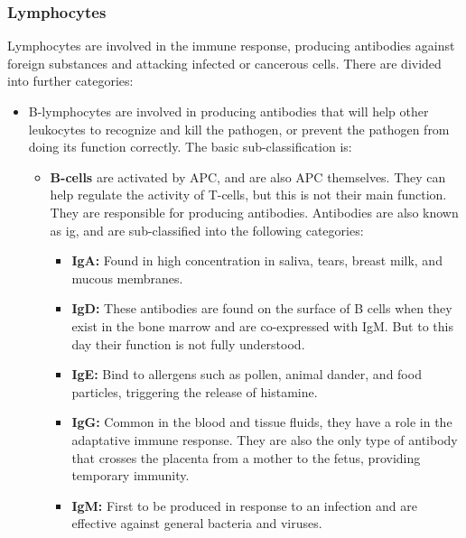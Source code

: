 \subsubsection{Lymphocytes}

Lymphocytes are involved in the immune response, producing antibodies against foreign substances and attacking infected or cancerous cells. There are divided into further categories:

    \begin{itemize}

        \item{B-lymphocytes} are involved in producing antibodies that will help other leukocytes to recognize and kill the pathogen, or prevent the pathogen from doing its function correctly. The basic sub-classification is:

        \begin{itemize}

            \item{\textbf{B-cells}} are activated by APC, and are also APC themselves. They can help regulate the activity of T-cells, but this is not their main function. They are responsible for producing antibodies. Antibodies are also known as \gls{ig}, and are sub-classified into the following categories:
    
                \begin{itemize}
        
                    \item{\textbf{IgA:}} Found in high concentration in saliva, tears, breast milk, and mucous membranes.
            
                    \item{\textbf{IgD:}} These antibodies are found on the surface of B cells when they exist in the bone marrow and are co-expressed with IgM. But to this day their function is not fully understood.
            
                    \item{\textbf{IgE:}} Bind to allergens such as pollen, animal dander, and food particles, triggering the release of histamine.
            
                    \item{\textbf{IgG:}} Common in the blood and tissue fluids, they have a role in the adaptative immune response. They are also the only type of antibody that crosses the placenta from a mother to the fetus, providing temporary immunity.
            
                    \item{\textbf{IgM:}} First to be produced in response to an infection and are effective against general bacteria and viruses.
                

\end{itemize}
\end{itemize}
\end{itemize}
